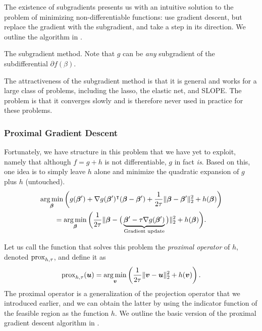 The existence of subgradients presents us with an intuitive solution to the problem of minimizing non-differentiable functions: use gradient descent, but replace the gradient with the subgradient, and take a step in its direction. We outline the algorithm in .

\begin{algorithm}
  \caption{The subgradient method. Note that \(g\) can be \emph{any} subgradient of the subdifferential \(\partial f(\beta)\).}
  \label{alg:subgradient-method}
\end{algorithm}

The attractiveness of the subgradient method is that it is general and works for a large class of problems, including the lasso, the elastic net, and SLOPE. The problem is that it converges slowly and is therefore never used in practice for these problems.

\subsubsection{Proximal Gradient Descent}

Fortunately, we have structure in this problem that we have yet to exploit, namely that although \(f = g + h\) is not differentiable, \(g\) in fact \emph{is}. Based on this, one idea is to simply leave \(h\) alone and minimize the quadratic expansion of \(g\) plus \(h\) (untouched).
\begin{multline*}
  \operatorname*{arg\,min}_{\boldsymbol{\beta}} \left( g(\boldsymbol{\beta}') + \nabla g(\boldsymbol{\beta}')^\intercal(\boldsymbol{\beta} - \boldsymbol{\beta}') + \frac{1}{2\tau}\lVert \boldsymbol{\beta} - \boldsymbol{\beta}'\rVert_2^2 + h(\boldsymbol{\beta}) \right) \\
  = \operatorname*{arg\,min}_{\boldsymbol{\beta}} \bigg( \frac{1}{2\tau}\lVert \boldsymbol{\beta} - \big(\underbrace{\boldsymbol{\beta}' - \tau \nabla g(\boldsymbol{\beta}')}_{\text{Gradient update}}\big)\rVert_2^2 + h(\boldsymbol{\beta})\bigg).
\end{multline*}

Let us call the function that solves this problem the \emph{proximal operator} of \(h\), denoted \(\operatorname{prox}_{h,\tau}\), and define it as
\[
  \operatorname{prox}_{h,\tau}(\boldsymbol{u}) = \operatorname*{arg\,min}_{\boldsymbol{v}} \left( \frac{1}{2\tau}\lVert \boldsymbol{v} - \boldsymbol{u}\rVert_2^2 + h(\boldsymbol{v}) \right).
\]
The proximal operator is a generalization of the projection operator that we introduced earlier, and we can obtain the latter by using the indicator function of the feasible region as the function \(h\). We outline the basic version of the proximal gradient descent algorithm in .

